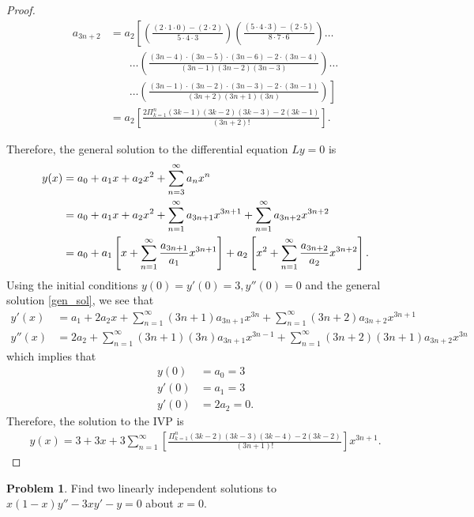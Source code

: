 \documentclass[12pt]{article}
\theoremstyle{definition}
\newtheorem{problem}{Problem}
\begin{document}
\begin{proof}
  \begin{align*}
    a_{3n+2} &= a_2\left[\left(\frac{(2\cdot 1\cdot 0) - (2\cdot2)}{5\cdot 4\cdot 3}\right)\left(\frac{(5\cdot 4\cdot 3) - (2\cdot5)}{8\cdot 7\cdot 6}\right)\dots\right. \\
    &\phantom{=}\ \ \dots\left(\frac{(3n-4)\cdot (3n-5)\cdot (3n-6) - 2\cdot(3n-4)}{(3n-1)(3n-2)(3n-3)}\right)\dots \\
    &\phantom{=}\ \ \left.\dots\left(\frac{(3n-1)\cdot (3n-2)\cdot (3n-3) - 2\cdot(3n-1)}{(3n+2)(3n+1)(3n)}\right)\right] \\
    &= a_2\left[\frac{2\Pi_{k=1}^{n} (3k-1)(3k-2)(3k-3) - 2(3k-1)}{(3n+2)!}\right].
  \end{align*}

  Therefore, the general solution to the differential equation $Ly = 0$ is
  \begin{align}\label{gen_sol}
    y(x) &= a_0 + a_1x + a_2x^2 + \sum_{n=3}^{\infty}a_nx^n \notag \\
    &= a_0 + a_1x + a_2x^2 + \sum_{n=1}^{\infty}a_{3n+1}x^{3n+1} + \sum_{n=1}^\infty a_{3n+2}x^{3n+2} \notag\\
    &= a_0 + a_1\left[x + \sum_{n=1}^{\infty}\frac{a_{3n+1}}{a_1}x^{3n+1}\right] + a_2\left[x^2 + \sum_{n=1}^\infty \frac{a_{3n+2}}{a_2}x^{3n+2} \right].
  \end{align}
  Using the initial conditions $y(0) = y'(0) = 3, y''(0) = 0$ and the general solution \eqref{gen_sol},
  we see that
  \begin{align*}
    y'(x) &= a_1 + 2a_2x + \sum_{n=1}^\infty (3n+1)a_{3n+1} x^{3n} +\sum_{n=1}^\infty(3n+2)a_{3n+2}x^{3n+1} \\
    y''(x) &= 2a_2 + \sum_{n=1}^\infty (3n+1)(3n)a_{3n+1} x^{3n-1} +\sum_{n=1}^\infty(3n+2)(3n+1)a_{3n+2}x^{3n}
  \end{align*}
  which implies that
  \begin{align*}
    y(0) &= a_0 = 3 \\
    y'(0) &= a_1 = 3 \\
    y'(0) &= 2a_2 = 0.
  \end{align*}
  Therefore, the solution to the IVP is
  \begin{align*}
    y(x) = 3 + 3x + 3\sum_{n=1}^{\infty}\left[\frac{\Pi_{k=1}^{n} (3k-2)(3k-3)(3k-4) - 2(3k-2)}{(3n+1)!}\right]x^{3n+1}.
  \end{align*}
\end{proof}
\newpage


\begin{problem}
  Find two linearly independent solutions to $x(1-x)y'' - 3xy'-y = 0$ about $x=0$.
\end{problem}
\end{document}
